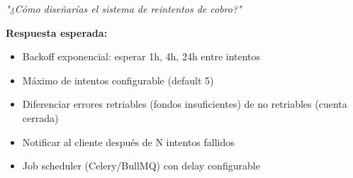 \documentclass[11pt,a4paper]{article}
\begin{document}
\begin{tcolorbox}[colback=warnambel!5,colframe=warnambel,title=\textbf{Pregunta probable en entrevista}]
\textit{"¿Cómo diseñarías el sistema de reintentos de cobro?"}

\textbf{Respuesta esperada:}
\begin{itemize}
  \item Backoff exponencial: esperar 1h, 4h, 24h entre intentos
  \item Máximo de intentos configurable (default 5)
  \item Diferenciar errores retriables (fondos insuficientes) de no retriables (cuenta cerrada)
  \item Notificar al cliente después de N intentos fallidos
  \item Job scheduler (Celery/BullMQ) con delay configurable
\end{itemize}
\end{tcolorbox}
\end{document}
